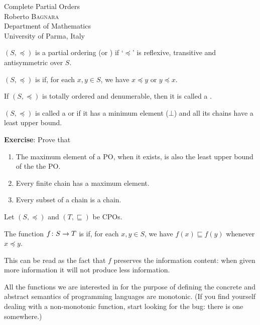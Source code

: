 \documentclass[online,helvetica,a4]{chaksem}
\begin{document}
\begin{slide}
  \vspace*{-.9\bigskipamount}
  \begin{center}
    \vspace*{\fill}
    \huge
    {\dblue Complete Partial Orders}
    \\[1.2em]
    \large
    {\dgreen Roberto \textsc{Bagnara}} \\
             Department of Mathematics \\
             University of Parma, Italy \\
  \end{center}%
  \vspace*{-.5\bigskipamount}
\end{slide}


\begin{slide} 

$(S, \preceq)$ is a partial ordering (or ) if `$\preceq$'
is reflexive, transitive and antisymmetric over $S$.

$(S, \preceq)$ is  if, for each $x, y \in S$,
we have $x \preceq y$ or $y \preceq x$.

If $(S, \preceq)$ is totally ordered and denumerable, then it
is called a .

$(S, \preceq)$ is called a  or 
if it has a minimum element ($\bot$) and all its chains
have a least upper bound.

\vfill
\textbf{Exercise}: Prove that
\begin{enumerate}
\item
The maximum element of a PO, when it exists, is also the least upper bound of the the PO.
\item
Every finite chain has a maximum element.
\item
Every subset of a chain is a chain.
\end{enumerate}
\end{slide}

\begin{slide} 

Let $(S, \preceq)$ and $(T, \sqsubseteq)$ be CPOs.

The function $\mathord{f}\colon S\to T$ is  if, for each $x, y \in S$,
we have $f(x) \sqsubseteq f(y)$ whenever $x \preceq y$.

This can be read as the fact that $f$ preserves the information content:
when given more information it will not produce less information.

All the functions we are interested in for the purpose of defining the
concrete and abstract semantics of programming languages are monotonic.
(If you find yourself dealing with a non-monotonic function, start
looking for the bug: there is one somewhere.)
\end{slide}
\end{document}
